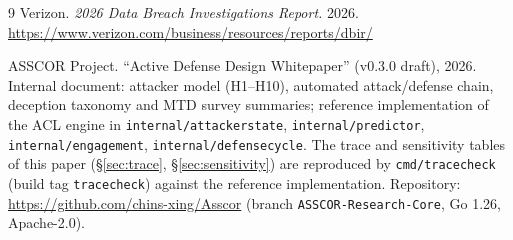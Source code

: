 \documentclass[11pt]{article}
\begin{document}
\begin{thebibliography}{9}
Verizon.
\textit{2026 Data Breach Investigations Report.}
2026.
\url{https://www.verizon.com/business/resources/reports/dbir/}

ASSCOR Project.
``Active Defense Design Whitepaper'' (v0.3.0 draft), 2026.
Internal document: attacker model (H1--H10), automated attack/defense
chain, deception taxonomy and MTD survey summaries; reference
implementation of the ACL engine in \texttt{internal/attackerstate},
\texttt{internal/predictor}, \texttt{internal/engagement},
\texttt{internal/defensecycle}. The trace and sensitivity tables of this
paper (\S\ref{sec:trace}, \S\ref{sec:sensitivity}) are reproduced by
\texttt{cmd/tracecheck} (build tag \texttt{tracecheck}) against the
reference implementation. Repository:
\url{https://github.com/chins-xing/Asscor} (branch
\texttt{ASSCOR-Research-Core}, Go 1.26, Apache-2.0).
\end{thebibliography}
\normalsize
\end{document}
